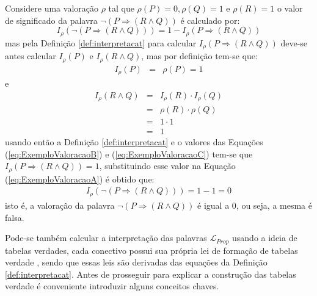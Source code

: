 \begin{exem}
    Considere uma valoração $\rho$ tal que $\rho(P) = 0, \rho(Q) = 1$ e $\rho(R) = 1$ o valor de significado da palavra $\neg(P \Rightarrow (R \land Q))$ é calculado por:
    \begin{equation}\label{eq:ExemploValoracaoA}
        I_\rho(\neg(P \Rightarrow (R \land Q))) = 1 - I_\rho(P \Rightarrow (R \land Q))
    \end{equation}
    mas pela Definição \ref{def:interpretacat} para calcular $I_\rho(P \Rightarrow (R \land Q))$ deve-se antes calcular $I_\rho(P)$ e $I_\rho(R \land Q)$, mas por definição tem-se que:
    \begin{eqnarray}\label{eq:ExemploValoracaoB}
        I_\rho(P) & = & \rho(P) = 1
    \end{eqnarray}
    e 
    \begin{eqnarray}\label{eq:ExemploValoracaoC}
        I_\rho(R \land Q) & = & I_\rho(R) \cdot I_\rho(Q) \nonumber\\
        & = & \rho(R) \cdot \rho(Q) \\
        & = & 1 \cdot 1 \nonumber \\
        & = & 1\nonumber
    \end{eqnarray}
    usando então a Definição \ref{def:interpretacat} e o valores das Equações (\ref{eq:ExemploValoracaoB}) e (\ref{eq:ExemploValoracaoC}) tem-se que $I_\rho(P \Rightarrow (R \land Q)) = 1$, substituindo esse valor na Equação (\ref{eq:ExemploValoracaoA}) é obtido que:
    \begin{eqnarray*}
        I_\rho(\neg(P \Rightarrow (R \land Q))) = 1 - 1 = 0
    \end{eqnarray*}
    isto é, a valoração da palavra $\neg(P \Rightarrow (R \land Q))$ é igual a 0, ou seja, a mesma é falsa.
\end{exem}

Pode-se também calcular a interpretação das palavras $\mathcal{L}_{Prop}$ usando a ideia de tabelas verdades, cada conectivo possui sua própria lei de formação de tabelas verdade \cite{BenjaV1, joaoPavao2014}, sendo que essas leis são derivadas das equações da Definição \ref{def:interpretacat}. Antes de prosseguir para explicar a construção das tabelas verdade é conveniente introduzir alguns conceitos chaves.

